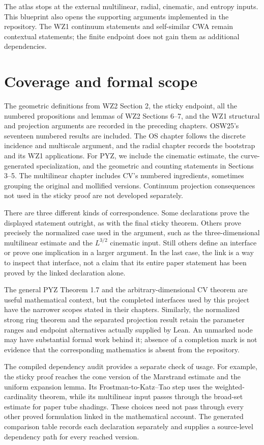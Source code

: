 The atlas stops at the external multilinear, radial, cinematic, and
entropy inputs. This blueprint also opens the supporting arguments
implemented in the repository. The WZ1 continuum statements and
self-similar CWA remain contextual statements; the finite endpoint
does not gain them as additional dependencies.

\section{Coverage and formal scope}

The geometric definitions from WZ2 Section 2, the sticky endpoint,
all the numbered propositions and lemmas of WZ2 Sections 6--7,
and the WZ1 structural and projection arguments are recorded in the
preceding chapters. OSW25's seventeen numbered results are included.
The OS chapter follows the discrete incidence and multiscale argument,
and the radial chapter records the bootstrap and its WZ1 applications.
For PYZ, we include the cinematic estimate, the curve-generated
specialization, and the geometric and counting statements in
Sections 3--5. The multilinear chapter includes CV's numbered
ingredients, sometimes grouping the original and mollified versions.
Continuum projection consequences not used in the sticky proof are
not developed separately.

There are three different kinds of correspondence. Some declarations
prove the displayed statement outright, as with the final sticky
theorem. Others prove precisely the normalized case used in the
argument, such as the three-dimensional multilinear estimate and the
$L^{3/2}$ cinematic input. Still others define an interface or prove
one implication in a larger argument. In the last case, the link is a
way to inspect that interface, not a claim that its entire paper
statement has been proved by the linked declaration alone.

The general PYZ Theorem 1.7 and the arbitrary-dimensional CV theorem
are useful mathematical context, but the completed interfaces used
by this project have the narrower scopes stated in their chapters.
Similarly, the normalized strong ring theorem and the separated
projection result retain the parameter ranges and endpoint alternatives
actually supplied by Lean. An unmarked node may have substantial
formal work behind it; absence of a completion mark is not evidence
that the corresponding mathematics is absent from the repository.

The compiled dependency audit provides a separate check of usage. For
example, the sticky proof reaches the cone version of the Marstrand
estimate and the uniform expansion lemma. Its Frostman-to-Katz--Tao
step uses the weighted-cardinality theorem, while its multilinear
input passes through the broad-set estimate for paper tube shadings.
These choices need not pass through every other proved formulation
linked in the mathematical account. The generated comparison table
records each declaration separately and supplies a source-level
dependency path for every reached version.

